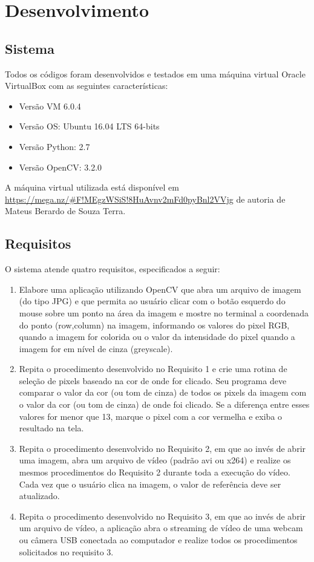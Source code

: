 \documentclass{bmvc2k}
\begin{document}
\section{Desenvolvimento}
\subsection{Sistema}
Todos os códigos foram desenvolvidos e testados em uma máquina virtual Oracle VirtualBox \cite{[VM]} com as seguintes características:
\begin{itemize}
    \item Versão VM 6.0.4
    \item Versão OS: Ubuntu 16.04 LTS 64-bits
    \item Versão Python: 2.7
    \item Versão OpenCV: 3.2.0
\end{itemize}
 A máquina virtual utilizada está disponível em \url{https://mega.nz/#F!MEgzWSiS!8HuAvnv2mFd0pyBnl2VVjg} de autoria de Mateus Berardo de Souza Terra.
 
\subsection{Requisitos}
O sistema atende quatro requisitos, especificados a seguir:

\begin{enumerate}
    \item Elabore uma aplicação utilizando OpenCV que abra um arquivo de imagem (do tipo JPG) e que permita ao usuário clicar com o botão esquerdo do mouse sobre um ponto na área da imagem e mostre no terminal a coordenada do ponto (row,column) na imagem, informando os valores do pixel RGB, quando a imagem for colorida ou o valor da intensidade do pixel quando a imagem for em nível de cinza (greyscale).
    \item  Repita o procedimento desenvolvido no Requisito 1 e crie uma rotina de seleção de pixels baseado na cor de onde for clicado. Seu programa deve comparar o valor da cor (ou tom de cinza) de todos os pixels da imagem com o valor da cor (ou tom de cinza) de onde foi clicado. Se a diferença entre esses valores for menor que 13, marque o pixel com a cor vermelha e exiba o resultado na tela.
    \item  Repita o procedimento desenvolvido no Requisito 2, em que ao invés de abrir uma imagem, abra um arquivo de vídeo (padrão avi ou x264) e realize os mesmos procedimentos do Requisito 2 durante toda a execução do vídeo. Cada vez que o usuário clica na imagem, o valor de referência deve ser atualizado.
    \item Repita o procedimento desenvolvido no Requisito 3, em que ao invés de abrir um arquivo de vídeo, a aplicação abra o streaming de vídeo de uma webcam ou câmera USB conectada ao computador e realize todos os procedimentos solicitados no requisito 3.
\end{enumerate}
\end{document}
